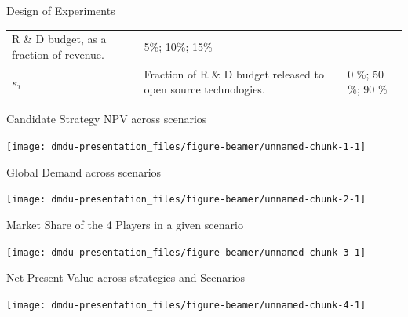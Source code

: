 \documentclass[ignorenonframetext,]{beamer}
\begin{document}
\begin{frame}{Design of Experiments}
\begin{longtable}[]{@{}lll@{}}
\begin{minipage}[t]{0.47\columnwidth}
R \& D budget, as a fraction of revenue.\strut
\end{minipage} & \begin{minipage}[t]{0.30\columnwidth}\raggedright\strut
5\%; 10\%; 15\%\strut
\end{minipage}\tabularnewline
\begin{minipage}[t]{0.14\columnwidth}\raggedright\strut
\(\kappa_i\)\strut
\end{minipage} & \begin{minipage}[t]{0.47\columnwidth}\raggedright\strut
Fraction of R \& D budget released to open source technologies.\strut
\end{minipage} & \begin{minipage}[t]{0.30\columnwidth}\raggedright\strut
0 \%; 50 \%; 90 \%\strut
\end{minipage}\tabularnewline
\bottomrule
\end{longtable}

\end{frame}

\begin{frame}{Candidate Strategy NPV across scenarios}

\begin{center}\texttt{[image: dmdu-presentation\_files/figure-beamer/unnamed-chunk-1-1]} \end{center}

\end{frame}

\begin{frame}{Global Demand across scenarios}

\begin{center}\texttt{[image: dmdu-presentation\_files/figure-beamer/unnamed-chunk-2-1]} \end{center}

\end{frame}

\begin{frame}{Market Share of the 4 Players in a given scenario}

\begin{center}\texttt{[image: dmdu-presentation\_files/figure-beamer/unnamed-chunk-3-1]} \end{center}

\end{frame}

\begin{frame}{Net Present Value across strategies and Scenarios}

\begin{center}\texttt{[image: dmdu-presentation\_files/figure-beamer/unnamed-chunk-4-1]} \end{center}

\end{frame}
\end{document}
